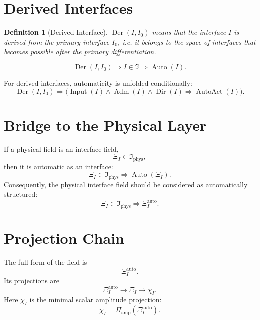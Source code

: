 \documentclass[12pt,a4paper]{article}
\newtheorem{definition}{Definition}
\DeclareMathOperator{\Auto}{Auto}
\DeclareMathOperator{\Input}{Input}
\DeclareMathOperator{\Adm}{Adm}
\DeclareMathOperator{\Dir}{Dir}
\DeclareMathOperator{\AutoAct}{AutoAct}
\DeclareMathOperator{\Der}{Der}
\newcommand{\Ispace}{\mathfrak I}
\newcommand{\XiAuto}{\Xi_I^{\mathrm{auto}}}
\newcommand{\PiAmp}{\Pi_{\mathrm{amp}}}
\begin{document}
\section{Derived Interfaces}
\begin{definition}[Derived Interface]
\(\Der(I,I_0)\) means that the interface \(I\) is derived from the primary interface \(I_0\), i.e. it belongs to the space of interfaces that becomes possible after the primary differentiation.
\end{definition}

\begin{equation}
\boxed{\Der(I,I_0)\Rightarrow I\in\Ispace\Rightarrow\Auto(I).}
\end{equation}

For derived interfaces, automaticity is unfolded conditionally:
\begin{equation}
\boxed{\Der(I,I_0)\Rightarrow\bigl(\Input(I)\land\Adm(I)\land\Dir(I)\Rightarrow\AutoAct(I)\bigr).}
\end{equation}

\section{Bridge to the Physical Layer}
If a physical field is an interface field,
\begin{equation}
\Xi_I\in\Ispace_{\mathrm{phys}},
\end{equation}
then it is automatic as an interface:
\begin{equation}
\boxed{\Xi_I\in\Ispace_{\mathrm{phys}}\Rightarrow\Auto(\Xi_I).}
\end{equation}
Consequently, the physical interface field should be considered as automatically structured:
\begin{equation}
\boxed{\Xi_I\in\Ispace_{\mathrm{phys}}\Rightarrow\XiAuto.}
\end{equation}

\section{Projection Chain}
The full form of the field is
\begin{equation}
\boxed{\XiAuto.}
\end{equation}
Its projections are
\begin{equation}
\boxed{\XiAuto\to\Xi_I\to\chi_I.}
\end{equation}
Here \(\chi_I\) is the minimal scalar amplitude projection:
\begin{equation}
\boxed{\chi_I=\PiAmp(\XiAuto).}
\end{equation}
\end{document}
